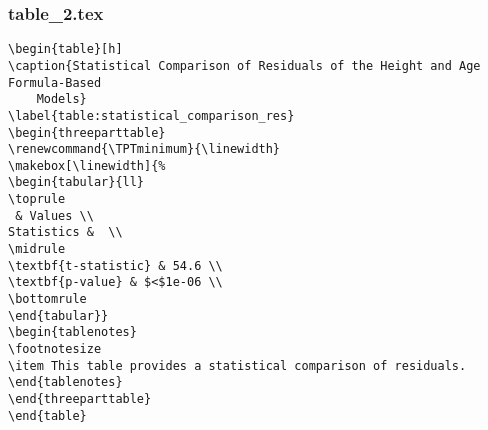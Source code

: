 \documentclass[11pt]{article}
\begin{document}
\subsubsection*{table\_2.tex}

\begin{Verbatim}[tabsize=4]
\begin{table}[h]
\caption{Statistical Comparison of Residuals of the Height and Age Formula-Based
	Models}
\label{table:statistical_comparison_res}
\begin{threeparttable}
\renewcommand{\TPTminimum}{\linewidth}
\makebox[\linewidth]{%
\begin{tabular}{ll}
\toprule
 & Values \\
Statistics &  \\
\midrule
\textbf{t-statistic} & 54.6 \\
\textbf{p-value} & $<$1e-06 \\
\bottomrule
\end{tabular}}
\begin{tablenotes}
\footnotesize
\item This table provides a statistical comparison of residuals.
\end{tablenotes}
\end{threeparttable}
\end{table}

\end{Verbatim}
\end{document}
